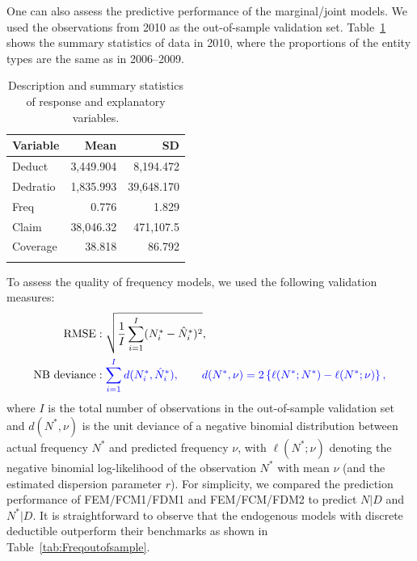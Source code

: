 \documentclass[11pt]{article}
\newcommand{\rev}[1]{{\color{blue}#1}}
\newcommand{\authnote}[1]{{\color{red}[\textbf{Note to authors:} #1]}}
\begin{document}
One can also assess the predictive performance of the marginal/joint models. We used the observations from 2010 as the out-of-sample validation set. Table~\ref{tab:2010lgpif summary} shows the summary statistics of data in 2010\rev{, where the proportions of the entity types are the same as in 2006--2009}.

\begin{table}[ht!]
\centering
\begin{tabular}[t]{lrr}
\toprule
  Variable  & Mean & SD\\
\midrule
Deduct  & 3,449.904 & 8,194.472\\
Dedratio  & 1,835.993 & 39,648.170\\
Freq  & 0.776& 1.829\\
Claim  & 38,046.32 & 471,107.5\\
Coverage & 38.818 & 86.792\\
\hhline{===}
\end{tabular}
\caption{Description and summary statistics of response and explanatory variables.}
\label{tab:2010lgpif summary}
\end{table}

To assess the quality of frequency models, we used the following validation measures:
$$
\begin{aligned}
\text{RMSE}&: \sqrt{\frac{1}{I}\sum_{i=1}^I (N^*_{i}-\hat{N}^*_i)^2}, \\
\text{NB deviance}&: \rev{\sum_{i=1}^{I} d(N^*_i, \hat{N}^*_i), \qquad d(N^*,\nu)=2\left\{\ell(N^*;N^*)-\ell(N^*;\nu)\right\},} \\
\end{aligned}
$$
where $I$ is the total number of observations in the out-of-sample validation set and $d(N^*, \nu)$ is \rev{the} unit deviance of a negative binomial distribution between actual frequency $N^*$ and predicted frequency $\nu$\rev{, with $\ell(N^*;\nu)$ denoting the negative binomial log-likelihood of the observation $N^*$ with mean $\nu$ (and the estimated dispersion parameter $r$)}. For simplicity, we compared the prediction performance of FEM/FCM1/FDM1 and FEM/FCM/FDM2 to predict $N|D$ and $N^*|D$. It is straightforward to observe that the endogenous models with discrete deductible outperform their benchmarks as shown in Table~\ref{tab:Freqoutofsample}.%
\end{document}
